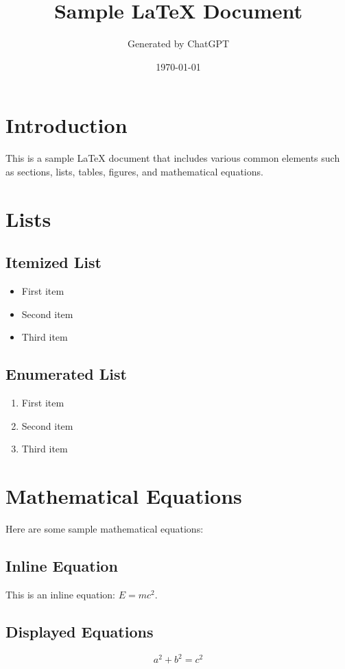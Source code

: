 \documentclass{article}
\title{Sample LaTeX Document}
\author{Generated by ChatGPT}
\date{\today}
\begin{document}
\maketitle


\tableofcontents


\section{Introduction}
This is a sample LaTeX document that includes various common elements such as sections, lists, tables, figures, and mathematical equations.


\section{Lists}
\subsection{Itemized List}
\begin{itemize}
\item First item
\item Second item
\item Third item
\end{itemize}


\subsection{Enumerated List}
\begin{enumerate}
\item First item
\item Second item
\item Third item
\end{enumerate}


\section{Mathematical Equations}
Here are some sample mathematical equations:


\subsection{Inline Equation}
This is an inline equation: \( E = mc^2 \).


\subsection{Displayed Equations}
\begin{equation}
a^2 + b^2 = c^2
\end{equation}
\end{document}
